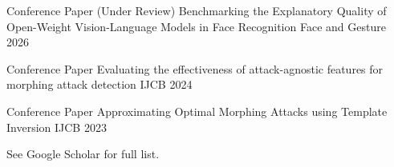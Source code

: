 

\begin{cvhonors}

  \cvhonor
    {Conference Paper (Under Review)} %
    {Benchmarking the Explanatory Quality of Open-Weight Vision-Language Models in Face Recognition} %
    {Face and Gesture} %
    {2026} %

  \cvhonor
    {Conference Paper} %
    {Evaluating the effectiveness of attack-agnostic features for morphing attack detection} %
    {IJCB} %
    {2024} %

  \cvhonor
    {Conference Paper} %
    {Approximating Optimal Morphing Attacks using Template Inversion} %
    {IJCB} %
    {2023} %

\end{cvhonors}
\tiny{See Google Scholar for full list.}
